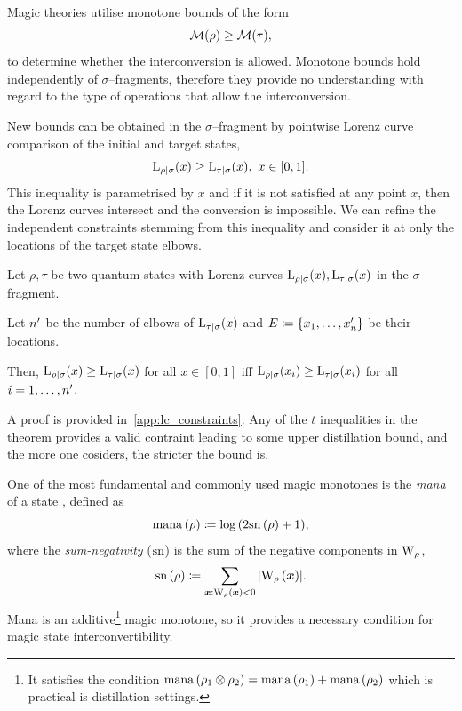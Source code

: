 \documentclass[pra,
aps,
twocolumn,
superscriptaddress,
groupedaddress,
nofootinbib,
reprint
]{revtex4-1}
\begin{document}
Magic theories utilise monotone bounds of the form
\begin{equation}\label{eq:majbound}
    \M(\rho) \geq \M(\tau),
\end{equation}
to determine whether the interconversion is allowed.
Monotone bounds hold independently of $\sigma$--fragments, therefore they provide no understanding with regard to the type of operations that allow the interconversion.

New bounds can be obtained in the $\sigma$--fragment by pointwise Lorenz curve comparison of the initial and target states,
\begin{equation}\label{eq:majbound}
    \lc{\rho}{\sigma}(x) \geq \lc{\tau}{\sigma}(x),\ x\in [0,1].
\end{equation}
This inequality is parametrised by $x$ and if it is not satisfied at any point $x$, then the Lorenz curves intersect and the conversion is impossible.
We can refine the independent constraints stemming from this inequality and consider it at only the locations of the target state elbows.
\begin{theorem}\label{thm:elbows}
	Let $\rho, \tau$ be two quantum states with Lorenz curves $\lc{\rho}{\sigma}(x), \lc{\tau}{\sigma}(x)$ in the $\sigma$-fragment.
	
	Let $\tt$ be the number of elbows of $\lc{\tau}{\sigma}(x)$ and $E \coloneqq \{x_1, \dots, x_\tt\}$ be their locations.
	
	Then, $\lc{\rho}{\sigma}(x) \geq \lc{\tau}{\sigma}(x)$ for all $x \in [0,1]$ iff $\lc{\rho}{\sigma}(x_{\ii}) \geq \lc{\tau}{\sigma}(x_{\ii})$ for all $\ii =1,\dots,\tt$.
\end{theorem}
A proof is provided in~\cref{app:lc_constraints}.
Any of the $t$ inequalities in the theorem provides a valid contraint leading to some upper distillation bound, and the more one cosiders, the stricter the bound is.


One of the most fundamental and commonly used magic monotones is the \emph{mana} of a state , defined as
\begin{equation}
    \mana{\rho} \coloneqq \log{(2\sn{\rho}+1)},
\end{equation}
where the \emph{sum-negativity} ($\rm{sn}$)  is the sum of the negative components in $\W{\rho}$,
\begin{equation}
    \sn{\rho} \coloneqq \sum\limits_{\bmx: \W[\bmx]{\rho} < 0} \abs{\W[\bmx]{\rho}}.
\end{equation}
Mana is an additive\footnote{It satisfies the condition $\mana{\rho_1 \otimes \rho_2} = \mana{\rho_1} + \mana{\rho_2}$ which is practical is distillation settings.} magic monotone, so it provides a necessary condition for magic state interconvertibility.
\end{document}
